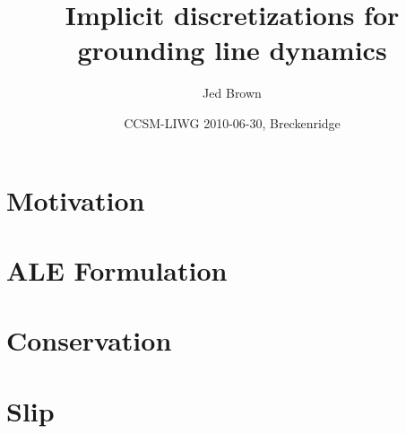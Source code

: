 \documentclass{beamer}
\title{Implicit discretizations for grounding line dynamics}
\author{Jed Brown}
\institute[ETH Z\"urich]
{
  Laboratory of Hydrology, Hydraulics, and Glaciology \\
  ETH Z\"urich
}
\date[CCSM 2010]{CCSM-LIWG 2010-06-30, Breckenridge}
\begin{document}
\lstset{language=C}
\normalem

\begin{frame}
\titlepage
\end{frame}


\section{Motivation}
%
%





\section{ALE Formulation}

%



\section{Conservation}


\section{Slip}

\end{document}
